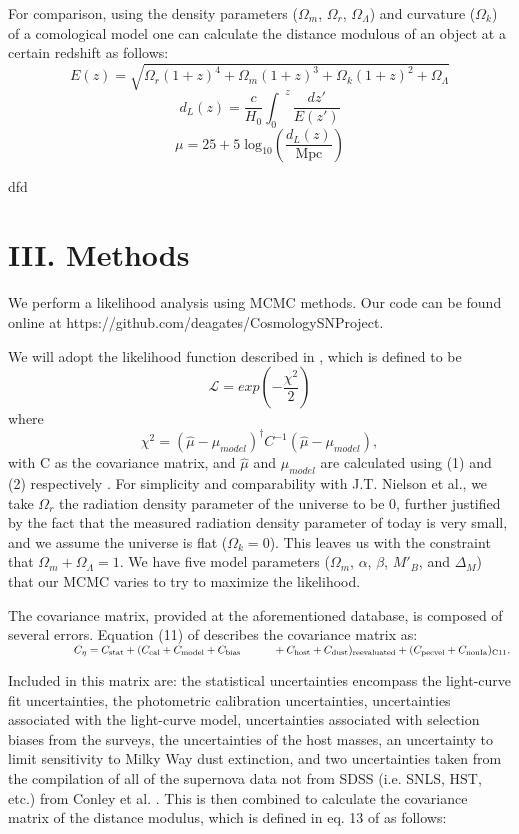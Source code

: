 \documentclass[aps,prl,reprint]{revtex4-1}
\begin{document}
For comparison, using the density parameters ($\Omega_m$, $\Omega_{r}$, $\Omega_{\Lambda}$) and curvature ($\Omega_k$) of a comological model one can calculate the distance modulous of an object at a certain redshift as follows:  
$$E(z)=\sqrt{\Omega_{r}(1+z)^4 + \Omega_m(1+z)^3 + \Omega_k(1+z)^2 + \Omega_{\Lambda}} $$
$$d_L(z)=\frac{c}{H_0} {\int_0}^z \frac{dz'}{E(z')} $$
$$\mu = 25 + 5\;\text{log}_{10} \left( \frac{d_L(z)}{\text{Mpc}} \right) $$
 
dfd
\section{III. Methods}
We perform a likelihood analysis using MCMC methods. Our code can be found online at https://github.com/deagates/CosmologySNProject.
\par We will adopt the likelihood function described in \cite{sdss}, which is defined to be $$\mathscr{L} = exp(-\frac{\chi^2}{2}) $$ where$$\chi^2 = (\hat{\mu}-\mu_{model})^\dagger C^{-1} (\hat{\mu}-\mu_{model}),$$  with C as the covariance matrix, and $\hat{\mu}$ and $\mu_{model}$ are calculated using (1) and (2) respectively . For simplicity and comparability with J.T. Nielson et al., we take $\Omega_r$ the radiation density parameter of the universe to be 0, further justified by the fact that the measured radiation density parameter of today is very small, and we assume the universe is flat ($\Omega_k = 0$). This leaves us with the constraint that $\Omega_m + \Omega_{\Lambda} = 1 $. We have five model parameters ($\Omega_m$, $\alpha$, $\beta$, $M'_B$, and $\Delta_M$) that our MCMC varies to try to maximize the likelihood.
\par The covariance matrix, provided at the aforementioned database, is composed of several errors. Equation (11) of \cite{sdss} describes the covariance matrix as: \begin{math}  \newline \newline  \indent \indent \indent \indent  C_\eta = C_{\text{stat}} + (C_{\text{cal}} + C_{\text{model}} + C_{\text{bias}} \newline
\indent \indent  + C_{\text{host}} + C_{\text{dust}})_{\text{reevaluated}} + (C_{\text{pecvel}}+C_{\text{nonIa}})_{\text{C11}}.\end{math}
\newline \par Included in this matrix are: the statistical uncertainties encompass the light-curve fit uncertainties, the photometric calibration uncertainties, uncertainties associated with the light-curve model, uncertainties associated with selection biases from the surveys, the uncertainties of the host masses, an uncertainty to limit sensitivity to Milky Way dust extinction, and two uncertainties taken from the compilation of all of the supernova data not from SDSS (i.e. SNLS, HST, etc.) from Conley et al. \cite{c11}. This is then combined to calculate the covariance matrix of the distance modulus, which is defined in eq. 13 of \cite{sdss} as follows:
\end{document}
